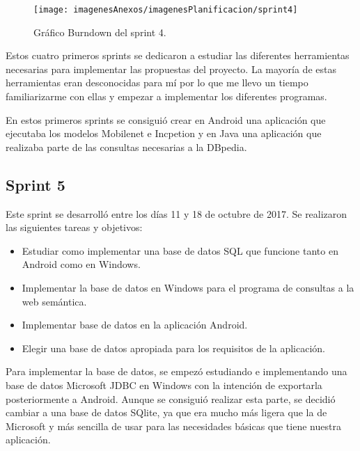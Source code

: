 \begin{figure}[h]
    \begin{center}%
        \begin{center}%
          \texttt{[image: imagenesAnexos/imagenesPlanificacion/sprint4]}%
          \caption{Gráfico Burndown del sprint 4.}%
          \label{figSprint4}%
        \end{center}%
  	\end{center}%
\end{figure}%

Estos cuatro primeros sprints se dedicaron a estudiar las diferentes herramientas necesarias para implementar las propuestas del proyecto. La mayoría de estas herramientas eran desconocidas para mí por lo que me llevo un tiempo familiarizarme con ellas y empezar a implementar los diferentes programas.

En estos primeros sprints se consiguió crear en Android una aplicación que ejecutaba los modelos Mobilenet e Incpetion y en Java una aplicación que realizaba parte de las consultas necesarias a la DBpedia.

\subsection{Sprint 5}

Este sprint se desarrolló entre los días 11 y 18 de octubre de 2017. Se realizaron las siguientes tareas y objetivos:

\begin{itemize}
	\item Estudiar como implementar una base de datos SQL que funcione tanto en Android como en Windows.
	\item Implementar la base de datos en Windows para el programa de consultas a la web semántica.
	\item Implementar base de datos en la aplicación Android.
	\item Elegir una base de datos apropiada para los requisitos de la aplicación.
\end{itemize}

Para implementar la base de datos, se empezó estudiando e implementando una base de datos Microsoft JDBC en Windows con la intención de exportarla posteriormente a Android. Aunque se consiguió realizar esta parte, se decidió cambiar a una base de datos SQlite, ya que era mucho más ligera que la de Microsoft y más sencilla de usar para las necesidades básicas que tiene nuestra aplicación.


